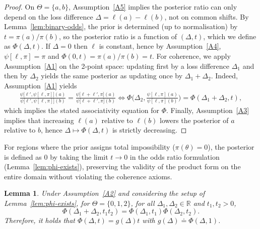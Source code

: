 \documentclass[accepted]{uai2026} %
\newtheorem{lemma}{Lemma}
\theoremstyle{remark}
\begin{document}
\begin{proof}
On $\Theta = \{a,b\}$, Assumption~\ref{A5} implies the posterior ratio can only depend on the loss difference $\Delta=\ell(a)-\ell(b)$, not on common shifts. By Lemma~\ref{lem:binary-odds}, the prior is determined (up to normalisation) by $t = \pi(a)/\pi(b)$, so the posterior ratio is a function of $(\Delta,t)$, which we define as $\Phi(\Delta,t)$. If $\Delta = 0$ then $\ell$ is constant, hence by Assumption~\ref{A4}, $\psi[\ell,\pi] = \pi$ and $\Phi(0,t) = \pi(a)/\pi(b) = t$. For coherence, we apply Assumption~\ref{A1} on the 2-point space: updating first by a loss difference $\Delta_1$ and then by $\Delta_2$ yields the same posterior as updating once by $\Delta_1 + \Delta_2$. Indeed, Assumption~\ref{A1} yields
\begin{align*}
\frac{\psi\big[\ell', \psi[\ell,\pi]\big](a)}{\psi\big[\ell', \psi[\ell,\pi]\big](b)} = \frac{\psi\big[\ell+\ell', \pi\big](a)}{\psi\big[\ell+\ell', \pi\big](b)}
\iff \Phi\bigg(\Delta_2, \frac{\psi[\ell,\pi](a)}{\psi[\ell,\pi](b)}\bigg) = \Phi(\Delta_1+\Delta_2,t),
\end{align*}
which implies the stated associativity equation for $\Phi$. Finally, Assumption~\ref{A3} implies that increasing $\ell(a)$ relative to $\ell(b)$ lowers the posterior of $a$ relative to $b$, hence $\Delta \mapsto \Phi(\Delta,t)$ is strictly decreasing.
\end{proof}


For regions where the prior assigns total impossibility ($\pi(\theta) = 0$), the posterior is defined as $0$ by taking the limit $t \to 0$ in the odds ratio formulation (Lemma~\ref{lem:phi-exists}), preserving the validity of the product form on the entire domain without violating the coherence axioms.

\begin{lemma}
\label{lem:triple-multiplicative}
Under Assumption~\ref{A2} and considering the setup of Lemma~\ref{lem:phi-exists}, for $\Theta = \{0,1,2\}$, for all $\Delta_1, \Delta_2 \in \mathbb{R}$ and $t_1, t_2 > 0$,
\[
\Phi(\Delta_1 + \Delta_2, t_1 t_2) = \Phi(\Delta_1, t_1) \Phi(\Delta_2, t_2).
\]
Therefore, it holds that $\Phi(\Delta,t) = g(\Delta)t$ with $g(\Delta) \doteq \Phi(\Delta,1)$.
\end{lemma}
\end{document}
